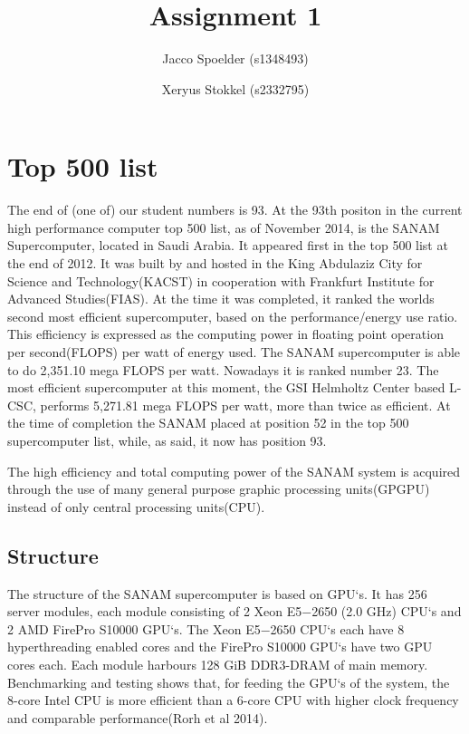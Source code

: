\documentclass[a4paper]{article}
\title{Assignment 1}
\author{Jacco Spoelder (s1348493) \and Xeryus Stokkel (s2332795)}
\begin{document}
\maketitle

\section{Top 500 list}
The end of (one of) our student numbers is 93. At the 93th positon in the current high performance computer top 500 list, as of November 2014, is the SANAM Supercomputer, located in Saudi Arabia. It appeared first in the top 500 list at the end of 2012. It was built by and hosted in the King Abdulaziz City for Science and Technology(KACST) in cooperation with Frankfurt Institute for Advanced Studies(FIAS). At the time it was completed, it ranked the worlds second most efficient supercomputer, based on the performance/energy use ratio. This efficiency is expressed as the computing power in floating point operation per second(FLOPS) per watt of energy used. The SANAM supercomputer is able to do 2,351.10 mega FLOPS per watt. Nowadays it is ranked number 23. The most efficient supercomputer at this moment, the GSI Helmholtz Center based L-CSC, performs 5,271.81 mega FLOPS per watt, more than twice as efficient. At the time of completion the SANAM placed at position 52 in the top 500 supercomputer list, while, as said, it now has position 93. 

The high efficiency and total computing power of the SANAM system is acquired through the use of many general purpose graphic processing units(GPGPU) instead of only central processing units(CPU).
\subsection{Structure}
The structure of the SANAM supercomputer is based on GPU`s. It has 256 server modules, each module consisting of 2 Xeon E5−2650 (2.0 GHz) CPU`s and 2 AMD FirePro S10000 GPU`s. The Xeon E5−2650 CPU`s each have 8 hyperthreading enabled cores and the FirePro S10000 GPU`s have two GPU cores each. Each module harbours 128 GiB DDR3-DRAM of main memory. Benchmarking and testing shows that, for feeding the GPU`s of the system, the 8-core Intel CPU is more efficient than a 6-core CPU with higher clock frequency and comparable performance(Rorh et al 2014).
\end{document}
